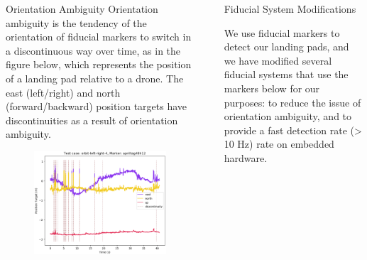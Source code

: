\documentclass[final, 20pt]{beamer}
\newlength{\sepwidth}
\newlength{\colwidth}
\newcommand{\separatorcolumn}{\begin{column}{\sepwidth}\end{column}}
\begin{document}
\begin{frame}[t]
\begin{columns}[t]
\begin{column}{\colwidth}
  \begin{block}{Orientation Ambiguity}
    Orientation ambiguity is the tendency of the orientation of fiducial markers to switch in a discontinuous way
    over time, as in the figure below, which represents the position of a landing pad relative to a drone.
    The east (left/right) and north (forward/backward) position targets have discontinuities as a result of orientation ambiguity.
    \vspace*{-0.5cm}
    \begin{figure}
      \includegraphics[width=0.65\linewidth]{images/orbit-left-right-4_apriltag48h12_position-target}
    \end{figure}

  \end{block}

  \end{column}

  \separatorcolumn

  \begin{column}{\colwidth}

  \begin{block}{Fiducial System Modifications}

    We use fiducial markers to detect our landing pads, and we have modified several fiducial systems that use the markers below for our purposes: to reduce the issue of
    orientation ambiguity, and to provide a fast detection rate (> 10 Hz) rate on embedded hardware.


\end{block}
\end{column}
\end{columns}
\end{frame}
\end{document}

